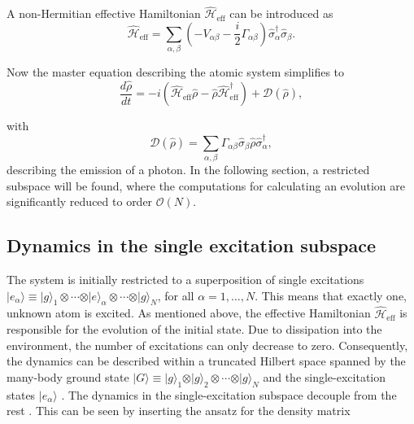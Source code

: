 \noindent
A non-Hermitian effective Hamiltonian $ \hat{\mathcal{H}}_{\text{eff}} $ can be introduced as
\begin{equation} \label{eq:H_eff}
    \hat{\mathcal{H}}_{\text{eff}} = \sum_{\alpha, \beta} \left(- V_{\alpha\beta} - \frac{i}{2} \Gamma_{\alpha\beta} \right)\hat{\sigma}_{\alpha}^{\dagger} \hat{\sigma}_{\beta}.
\end{equation}

\noindent
Now the master equation describing the atomic system simplifies to
\begin{equation}
    \frac{d\hat{\rho}}{dt} = - i \left( \hat{\mathcal{H}}_{\text{eff}} \hat{\rho} - \hat{\rho} \hat{\mathcal{H}}_{\text{eff}}^\dagger \right) + \mathcal{D}(\hat{\rho}),
\end{equation}

\noindent
with
\begin{equation}
\mathcal{D}(\hat{\rho}) = \sum_{\alpha,\beta} \Gamma_{\alpha\beta} \hat{\sigma}_{\beta} \hat{\rho} \hat{\sigma}_{\alpha}^\dagger,
\end{equation}
describing the emission of a photon.
In the following section, a restricted subspace will be found,
where the computations for calculating an evolution are significantly reduced to order $ \mathcal{O}(N) $.



\subsection{Dynamics in the single excitation subspace} \label{sec:Single_Excitation}
The system is initially restricted to a superposition of single excitations
$\vert e_{\alpha} \rangle \equiv \vert g\rangle_1 \otimes \cdots \otimes \vert e\rangle_\alpha \otimes \cdots \otimes \vert g\rangle_N$, for all $\alpha = 1, \ldots, N$.
This means that exactly one, unknown atom is excited.
As mentioned above, the effective Hamiltonian $\hat{\mathcal{H}}_{\text{eff}}$ is responsible for the evolution of the initial state.
Due to dissipation into the environment, the number of excitations can only decrease to zero.
Consequently, the dynamics can be described within a truncated Hilbert space spanned by the many-body ground state
$\vert G\rangle \equiv \vert g\rangle_1 \otimes \vert g\rangle_2 \otimes \cdots \otimes \vert g\rangle_N$
and the single-excitation states $\vert e_{\alpha} \rangle$ \cite{Bienaime2012}.
The dynamics in the single-excitation subspace decouple from the rest \cite{Needham2019}.
This can be seen by inserting the ansatz for the density matrix

